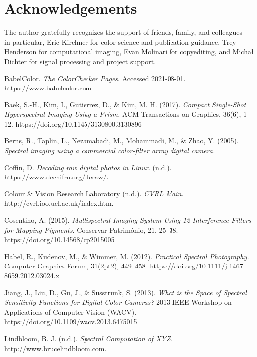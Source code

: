 \documentclass[twocolumn,10pt]{asme2ej}
\begin{document}
\section{Acknowledgements}

The author gratefully recognizes the support of friends, family, and colleagues --- in particular, Eric Kirchner for color science and publication guidance, Trey Henderson for computational imaging, Evan Molinari for copyediting, and Michał Dichter for signal processing and project support.


 \begin{thebibliography}{12}

{BabelColor. \emph{The ColorChecker Pages}. Accessed 2021-08-01. https://www.babelcolor.com}

{Baek, S.-H., Kim, I., Gutierrez, D., \& Kim, M. H. (2017). \emph{Compact Single-Shot Hyperspectral Imaging Using a Prism.} ACM Transactions on Graphics, 36(6), 1–12. https://doi.org/10.1145/3130800.3130896}

{Berns, R., Taplin, L., Nezamabadi, M., Mohammadi, M., \& Zhao, Y. (2005). \emph{Spectral imaging using a commercial color-filter array digital camera.}}

{Coffin, D. \emph{Decoding raw digital photos in Linux}. (n.d.). https://www.dechifro.org/dcraw/.}

{Colour \& Vision Research Laboratory (n.d.). \emph{CVRL Main.} http://cvrl.ioo.ucl.ac.uk/index.htm.}

{Cosentino, A. (2015). \emph{Multispectral Imaging System Using 12 Interference Filters for Mapping Pigments.} Conservar Património, 21, 25–38. https://doi.org/10.14568/cp2015005}

{Habel, R., Kudenov, M., \& Wimmer, M. (2012). \emph{Practical Spectral Photography.} Computer Graphics Forum, 31(2pt2), 449–458. https://doi.org/10.1111/j.1467-8659.2012.03024.x}

{Jiang, J., Liu, D., Gu, J., \& Susstrunk, S. (2013). \emph{What is the Space of Spectral Sensitivity Functions for Digital Color Cameras?} 2013 IEEE Workshop on Applications of Computer Vision (WACV). https://doi.org/10.1109/wacv.2013.6475015}

{Lindbloom, B. J. (n.d.). \emph{Spectral Computation of XYZ.} http://www.brucelindbloom.com.}


\end{thebibliography}
\end{document}
